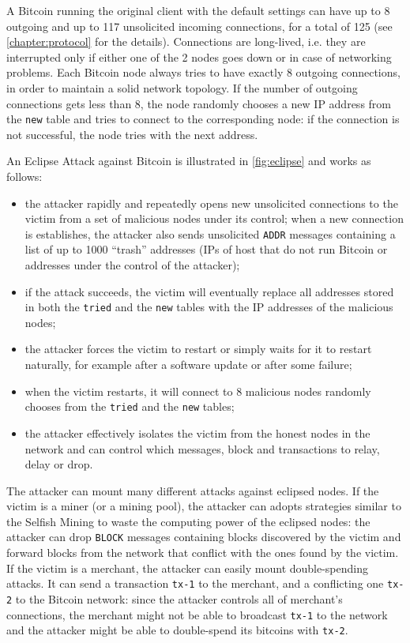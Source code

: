 A Bitcoin running the original client \cite{bitcoin_github} with the default settings can have up to \num{8} outgoing and up to \num{117} unsolicited incoming connections, for a total of \num{125} \cite{deanonymisation_2014, eclipse_attack_2015} (see \cref{chapter:protocol} for the details).
Connections are long-lived, i.e. they are interrupted only if either one of the \num{2} nodes goes down or in case of networking problems.
Each Bitcoin node always tries to have exactly \num{8} outgoing connections, in order to maintain a solid network topology.
If the number of outgoing connections gets less than \num{8}, the node randomly chooses a new IP address from the \texttt{new} table and tries to connect to the corresponding node:
if the connection is not successful, the node tries with the next address.

\bigskip
An Eclipse Attack against Bitcoin \cite{eclipse_attack_2015} is illustrated in \cref{fig:eclipse} and works as follows:
\begin{itemize}
	\item the attacker rapidly and repeatedly opens new unsolicited connections to the victim from a set of malicious nodes under its control; when a new connection is establishes, the attacker also sends unsolicited \texttt{ADDR} messages containing a list of up to \num{1000} ``trash'' addresses (IPs of host that do not run Bitcoin or addresses under the control of the attacker);
	\item if the attack succeeds, the victim will eventually replace all addresses stored in both the \texttt{tried} and the \texttt{new} tables with the IP addresses of the malicious nodes;
	\item the attacker forces the victim to restart \cite{cve_bloom_filter_2013, bitcoin_common_vulnerabilities} or simply waits for it to restart naturally, for example after a software update or after some failure;
	\item when the victim restarts, it will connect to \num{8} malicious nodes randomly chooses from the \texttt{tried} and the \texttt{new} tables;
	\item the attacker effectively isolates the victim from the honest nodes in the network and can control which messages, block and transactions to relay, delay or drop.
\end{itemize}

The attacker can mount many different attacks against eclipsed nodes.
If the victim is a miner (or a mining pool), the attacker can adopts strategies similar to the Selfish Mining to waste the computing power of the eclipsed nodes:
the attacker can drop \texttt{BLOCK} messages containing blocks discovered by the victim and forward blocks from the network that conflict with the ones found by the victim.
If the victim is a merchant, the attacker can easily mount double-spending attacks.
It can send a transaction \texttt{tx-1} to the merchant, and a conflicting one \texttt{tx-2} to the Bitcoin network:
since the attacker controls all of merchant's connections, the merchant might not be able to broadcast \texttt{tx-1} to the network and the attacker might be able to double-spend its bitcoins with \texttt{tx-2}.
